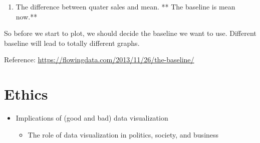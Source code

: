 \documentclass[]{book}
\newenvironment{Shaded}{\begin{snugshade}}{\end{snugshade}}
\newcommand{\KeywordTok}[1]{\textcolor[rgb]{0.13,0.29,0.53}{\textbf{#1}}}
\newcommand{\DataTypeTok}[1]{\textcolor[rgb]{0.13,0.29,0.53}{#1}}
\newcommand{\DecValTok}[1]{\textcolor[rgb]{0.00,0.00,0.81}{#1}}
\newcommand{\StringTok}[1]{\textcolor[rgb]{0.31,0.60,0.02}{#1}}
\newcommand{\CommentTok}[1]{\textcolor[rgb]{0.56,0.35,0.01}{\textit{#1}}}
\newcommand{\OtherTok}[1]{\textcolor[rgb]{0.56,0.35,0.01}{#1}}
\newcommand{\ControlFlowTok}[1]{\textcolor[rgb]{0.13,0.29,0.53}{\textbf{#1}}}
\newcommand{\OperatorTok}[1]{\textcolor[rgb]{0.81,0.36,0.00}{\textbf{#1}}}
\newcommand{\NormalTok}[1]{#1}
\providecommand{\tightlist}{%
  \setlength{\itemsep}{0pt}\setlength{\parskip}{0pt}}
\theoremstyle{definition}
\theoremstyle{definition}
\theoremstyle{definition}
\theoremstyle{remark}
\begin{document}
\begin{enumerate}
\def\labelenumi{\arabic{enumi}.}
\setcounter{enumi}{4}
\tightlist
\item
  The difference between quater sales and mean. ** The baseline is mean
  now.**
\end{enumerate}

\begin{Shaded}
\end{Shaded}

So before we start to plot, we should decide the baseline we want to
use. Different baseline will lead to totally different graphs.

Reference: \url{https://flowingdata.com/2013/11/26/the-baseline/}

\chapter{Ethics}\label{ethics}

\begin{itemize}
\tightlist
\item
  Implications of (good and bad) data visualization

  \begin{itemize}
  \tightlist
  \item
    The role of data visualization in politics, society, and business
  \end{itemize}
\end{itemize}
\end{document}
